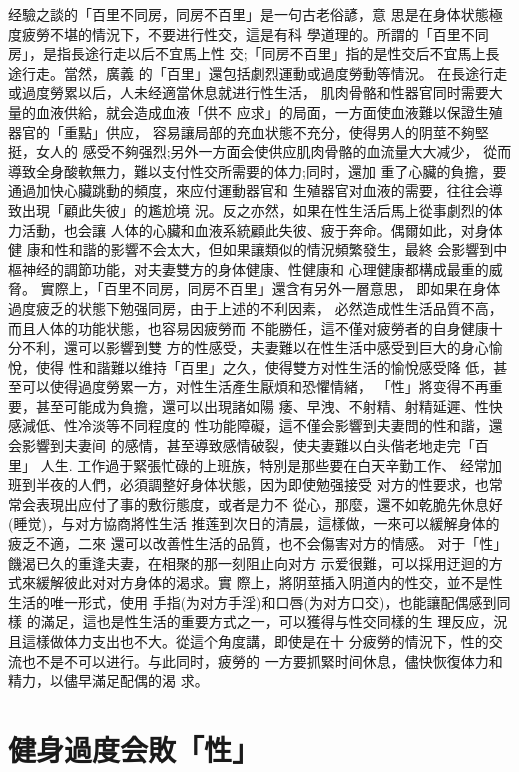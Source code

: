 \documentclass[12pt,UTF8]{ctexbook}
\begin{document}
经驗之談的「百里不同房，同房不百里」是一句古老俗諺，意
思是在身体状態極度疲勞不堪的情況下，不要进行性交，這是有科
學道理的。所謂的「百里不同房」，是指長途行走以后不宜馬上性
交;「同房不百里」指的是性交后不宜馬上長途行走。當然，廣義
的「百里」還包括劇烈運動或過度勞動等情況。
在長途行走或過度勞累以后，人未经適當休息就进行性生活，
肌肉骨骼和性器官同时需要大量的血液供給，就会造成血液「供不
应求」的局面，一方面使血液難以保證生殖器官的「重點」供应，
容易讓局部的充血状態不充分，使得男人的阴莖不夠堅挺，女人的
感受不夠强烈;另外一方面会使供应肌肉骨骼的血流量大大减少，
從而導致全身酸軟無力，難以支付性交所需要的体力;同时，還加
重了心臟的負擔，要通過加快心臟跳動的頻度，來应付運動器官和
生殖器官对血液的需要，往往会導致出現「顧此失彼」的尷尬境
況。反之亦然，如果在性生活后馬上從事劇烈的体力活動，也会讓
人体的心臟和血液系統顧此失彼、疲于奔命。偶爾如此，对身体健
康和性和諧的影響不会太大，但如果讓類似的情況頻繁發生，最終
会影響到中樞神经的調節功能，对夫妻雙方的身体健康、性健康和
心理健康都構成最重的威脅。
實際上，「百里不同房，同房不百里」還含有另外一層意思，
即如果在身体過度疲乏的状態下勉强同房，由于上述的不利因素，
必然造成性生活品質不高，而且人体的功能状態，也容易因疲勞而
不能勝任，這不僅对疲勞者的自身健康十分不利，還可以影響到雙
方的性感受，夫妻難以在性生活中感受到巨大的身心愉悅，使得
性和諧難以维持「百里」之久，使得雙方对性生活的愉悅感受降
低，甚至可以使得過度勞累一方，对性生活產生厭煩和恐懼情緒，
「性」將变得不再重要，甚至可能成为負擔，還可以出現諸如陽
痿、早洩、不射精、射精延遲、性快感減低、性冷淡等不同程度的
性功能障礙，這不僅会影響到夫妻問的性和諧，還会影響到夫妻间
的感情，甚至導致感情破裂，使夫妻難以白头偕老地走完「百里」
人生.
工作過于緊張忙碌的上班族，特別是那些要在白天辛勤工作、
经常加班到半夜的人們，必須調整好身体状態，因为即使勉强接受
对方的性要求，也常常会表現出应付了事的敷衍態度，或者是力不
從心，那麼，還不如乾脆先休息好(睡觉)，与对方協商將性生活
推莲到次日的清晨，這樣做，一來可以緩解身体的疲乏不適，二來
還可以改善性生活的品質，也不会傷害对方的情感。
对于「性」饑渴已久的重逢夫妻，在相聚的那一刻阻止向对方
示爱很難，可以採用迂迴的方式來緩解彼此对对方身体的渴求。實
際上，將阴莖插入阴道内的性交，並不是性生活的唯一形式，使用
手指(为对方手淫)和口唇(为对方口交)，也能讓配偶感到同樣
的滿足，這也是性生活的重要方式之一，可以獲得与性交同樣的生
理反应，況且這樣做体力支出也不大。從這个角度講，即使是在十
分疲勞的情況下，性的交流也不是不可以进行。与此同时，疲勞的
一方要抓緊时间休息，儘快恢復体力和精力，以儘早滿足配偶的渴
求。

\section{健身過度会敗「性」}
\end{document}
